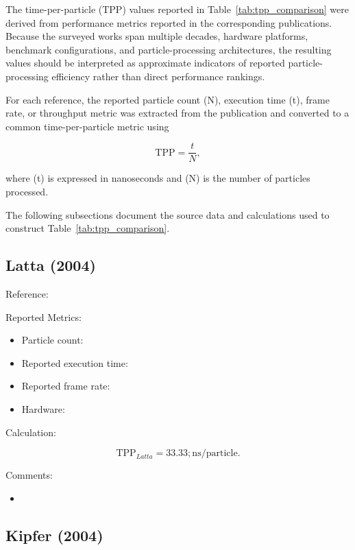 The time-per-particle (TPP) values reported in
Table~\ref{tab:tpp_comparison} were derived from performance metrics
reported in the corresponding publications. Because the surveyed works
span multiple decades, hardware platforms, benchmark configurations,
and particle-processing architectures, the resulting values should be
interpreted as approximate indicators of reported particle-processing
efficiency rather than direct performance rankings.

For each reference, the reported particle count (N), execution time
(t), frame rate, or throughput metric was extracted from the
publication and converted to a common time-per-particle metric using

\begin{equation}\mathrm{TPP}=\frac{t}{N},\end{equation}

where (t) is expressed in nanoseconds and (N) is the number of
particles processed.

The following subsections document the source data and calculations
used to construct Table~\ref{tab:tpp_comparison}.

\subsection{Latta (2004)}

Reference:
\cite{latta}

Reported Metrics:

\begin{itemize}
\item Particle count:
\item Reported execution time:
\item Reported frame rate:
\item Hardware:
\end{itemize}

Calculation:

\begin{equation}
\mathrm{TPP}_{Latta}=33.33;\mathrm{ns/particle}.
\end{equation}

Comments:

\begin{itemize}
\item
\end{itemize}

\subsection{Kipfer (2004)}

